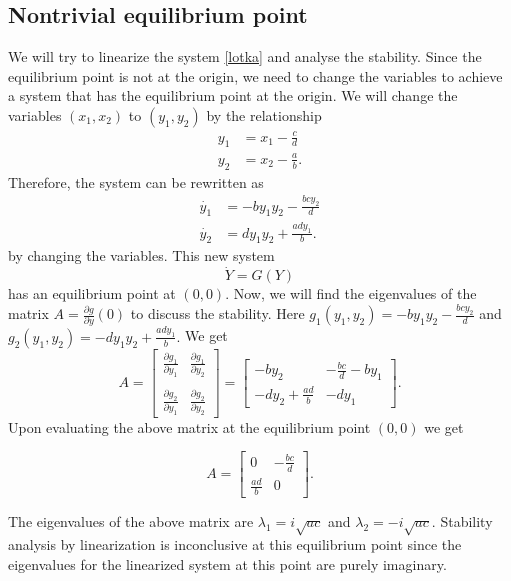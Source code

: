 \documentclass{article}
\begin{document}
\subsection{Nontrivial equilibrium point}
We will try to linearize the system \eqref{lotka} and analyse the stability. Since the equilibrium point is not at the origin, we need to change the variables to achieve a system that has the equilibrium point at the origin. We will change the variables $(x_1,x_2)$ to $(y_1,y_2)$ by the relationship
\begin{align*}
  y_1 &= x_1-\frac{c}{d}\\
  y_2 &= x_2 - \frac{a}{b}.
\end{align*}
Therefore, the system can be rewritten as 
\begin{align*}
  \dot{y_1} &= -by_1y_2-\frac{bcy_2}{d}\\
  \dot{y_2} &= dy_1y_2+\frac{ady_1}{b}.
\end{align*}
by changing the variables. This new system 
\begin{equation}\label{new}
    \dot{Y} = G(Y)
\end{equation}
has an equilibrium point at $(0,0)$. Now, we will find the eigenvalues of the matrix $A = \frac{\partial{g}}{\partial{y}}(0)$ to discuss the stability. Here $g_1(y_1,y_2)=-by_1y_2-\frac{bcy_2}{d}$ and $g_2(y_1,y_2) = -dy_1y_2+\frac{ady_1}{b}.$ We get 
\[
A = \begin{bmatrix}
    \frac{\partial{g_1}}{\partial{y_1}} & \frac{\partial{g_1}}{\partial{y_2}} \\\\
    \frac{\partial{g_2}}{\partial{y_1}} & \frac{\partial{g_2}}{\partial{y_2}}
\end{bmatrix} = \begin{bmatrix}
    -by_2 & -\frac{bc}{d}-by_1 \\
    -dy_2 +\frac{ad}{b}& -dy_1
\end{bmatrix}.
\]
Upon evaluating the above matrix at the equilibrium point $(0,0)$ we get 

\[
A =  \begin{bmatrix}
    0 & -\frac{bc}{d} \\
    \frac{ad}{b} & 0
\end{bmatrix}.
\]

The eigenvalues of the above matrix are $\lambda_1=i\sqrt{ac}$ and $\lambda_2=-i\sqrt{ac}.$ Stability analysis by linearization is inconclusive at this equilibrium point since the eigenvalues for the linearized system at this point are purely imaginary. 
\end{document}
